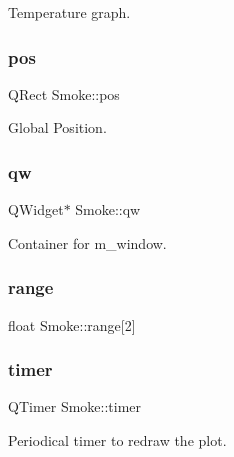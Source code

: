 Temperature graph. 

\mbox{\label{classSmoke_ae762c3ace8ef3b2aafab01e1c28f7523}} 
\subsubsection{\texorpdfstring{pos}{pos}}
{\footnotesize\ttfamily Q\+Rect Smoke\+::pos\hspace{0.3cm}{\ttfamily [private]}}



Global Position. 

\mbox{\label{classSmoke_ae04389450b60548adaf2ff0e76399673}} 
\subsubsection{\texorpdfstring{qw}{qw}}
{\footnotesize\ttfamily Q\+Widget$\ast$ Smoke\+::qw\hspace{0.3cm}{\ttfamily [private]}}



Container for m\+\_\+window. 

\mbox{\label{classSmoke_ae27bb310eec891bf0973a263383563a5}} 
\subsubsection{\texorpdfstring{range}{range}}
{\footnotesize\ttfamily float Smoke\+::range\mbox{[}2\mbox{]}\hspace{0.3cm}{\ttfamily [private]}}

\mbox{\label{classSmoke_ab86a0c9a3d30df9136fd8b2cb0c875ad}} 
\subsubsection{\texorpdfstring{timer}{timer}}
{\footnotesize\ttfamily Q\+Timer Smoke\+::timer\hspace{0.3cm}{\ttfamily [private]}}



Periodical timer to redraw the plot. 

